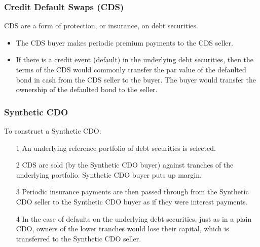 \documentclass[xcolor=dvipsnames]{beamer}
\begin{document}
%
\begin{frame}
  \frametitle{Credit Default Swaps (CDS)}
CDS are a form of protection, or insurance, on debt securities. 
\begin{itemize}
\item The CDS buyer makes periodic premium payments to the CDS seller.
\item If there is a credit event (default) in the underlying debt securities, then the terms of the CDS would commonly transfer the par value of the defaulted bond in cash from the CDS seller to the buyer. The buyer would transfer the ownership of the defaulted bond to the seller.
\end{itemize}
\end{frame}
%
\begin{frame}
  \frametitle{Synthetic CDO}
To construct a Synthetic CDO:
\begin{itemize}
\item[1] An underlying reference portfolio of debt securities is selected.
\item[2] CDS are sold (by the Synthetic CDO buyer) against tranches of the underlying portfolio. Synthetic CDO buyer puts up margin.
\item[3] Periodic insurance payments are then passed through from the Synthetic CDO seller to the Synthetic CDO buyer as if they were interest payments.
\item[4] In the case of defaults on the underlying debt securities, just as in a plain CDO, owners of the lower tranches would lose their capital, which is transferred to the Synthetic CDO seller. 
\end{itemize}
\end{frame}
%
\end{document}
